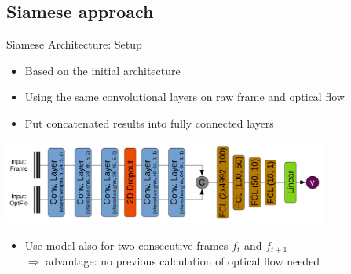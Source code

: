 \subsection{Siamese approach}

\begin{frame}{Siamese Architecture: Setup}
	\begin{itemize}
		\item Based on the initial architecture
		\item Using the same convolutional layers on raw frame and optical flow
		\item Put concatenated results into fully connected layers
	\end{itemize}
	\begin{center}
	\includegraphics[width=0.8\textwidth]{imgs/siamese_model.png}
	\end{center}
	\begin{itemize}
		\item Use model also for two consecutive frames $f_t$ and $f_{t+1}$\\
		$\Rightarrow$ advantage: no previous calculation of optical flow needed
	\end{itemize}
\end{frame}

